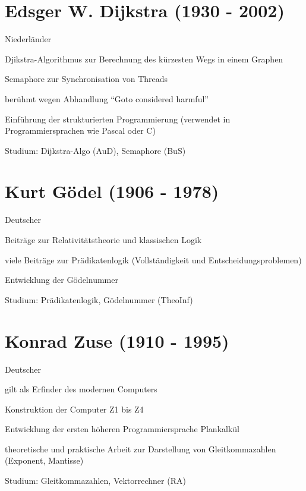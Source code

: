 \documentclass[a4paper,12pt]{report}
\begin{document}
\section*{Edsger W. Dijkstra (1930 - 2002)}
\begin{itemize*}
	\item Niederländer
	\item Djikstra-Algorithmus zur Berechnung des kürzesten Wegs in einem Graphen
	\item Semaphore zur Synchronisation von Threads
	\item berühmt wegen Abhandlung ``Goto considered harmful''
	\item Einführung der strukturierten Programmierung (verwendet in Programmiersprachen wie Pascal oder C)
	\item Studium: Dijkstra-Algo (AuD), Semaphore (BuS)
\end{itemize*}

\section*{Kurt Gödel (1906 - 1978)}
\begin{itemize*}
	\item Deutscher
	\item Beiträge zur Relativitätstheorie und klassischen Logik
	\item viele Beiträge zur Prädikatenlogik (Vollständigkeit und Entscheidungsproblemen)
  \item Entwicklung der Gödelnummer
  \item Studium: Prädikatenlogik, Gödelnummer (TheoInf)
\end{itemize*}

\section*{Konrad Zuse (1910 - 1995)}
\begin{itemize*}
	\item Deutscher
	\item gilt als Erfinder des modernen Computers
	\item Konstruktion der Computer Z1 bis Z4
	\item Entwicklung der ersten höheren Programmiersprache Plankalkül
	\item theoretische und praktische Arbeit zur Darstellung von Gleitkommazahlen (Exponent, Mantisse)
	\item Studium: Gleitkommazahlen, Vektorrechner (RA)
\end{itemize*}
\end{document}

